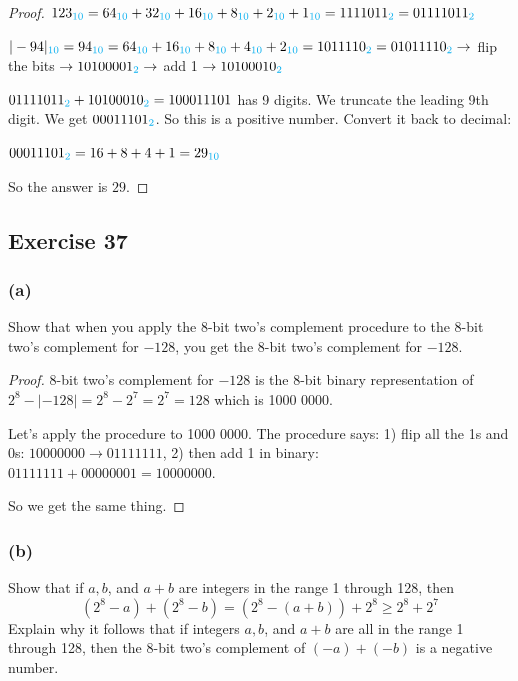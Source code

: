 \documentclass[14pt]{extarticle}
\newcommand{\base}[1]{{\color{cyan}#1}}
\begin{document}
\begin{proof}
$123_\base{10} = 64_\base{10} + 32_\base{10} + 16_\base{10} +
8_\base{10} + 2_\base{10} + 1_\base{10} = 1111011_\base{2} = 01111011_\base{2}$

$|-94|_\base{10} = 94_\base{10} = 64_\base{10} + 16_\base{10} + 8_\base{10} + 4_\base{10} + 2_\base{10} = 1011110_\base{2} = 01011110_\base{2} \to$ flip the bits $\to 10100001_\base{2} \to$ add 1 $\to 10100010_\base{2}$

$01111011_\base{2} + 10100010_\base{2} = 1 0001 1101$ has 9 digits. We truncate the leading 9th digit. We get $00011101_\base{2}$. So this is a positive number. Convert it back to decimal:

$00011101_\base{2} = 16 + 8 + 4 + 1 = 29_\base{10}$

So the answer is $29$.
\end{proof}

\subsection{Exercise 37}
\subsubsection{(a)}
Show that when you apply the 8-bit two's complement procedure to the 8-bit two’s complement for $-128$, you get the 8-bit two’s complement for $-128$.

\begin{proof}
8-bit two's complement for $-128$ is the 8-bit binary representation of $2^8 - |-128| = 2^8 - 2^7 = 2^7 = 128$ which is 1000 0000.

Let's apply the procedure to 1000 0000. The procedure says: 1) flip all the 1s and 0s: $1000 0000 \to 0111 1111$, 2) then add 1 in binary: $0111 1111 + 0000 0001 = 1000 0000$.

So we get the same thing.
\end{proof}

\subsubsection{(b)}
Show that if $a, b$, and $a + b$ are integers in the range 1 through 128, then $$ (2^8 - a) + (2^8 - b) = (2^8 - (a + b)) + 2^8 \geq 2^8 + 2^7 $$ Explain why it follows that if integers $a, b$, and $a + b$ are all in the range 1 through 128, then the 8-bit two’s complement of $(-a) + (-b)$ is a negative number.
\end{document}
